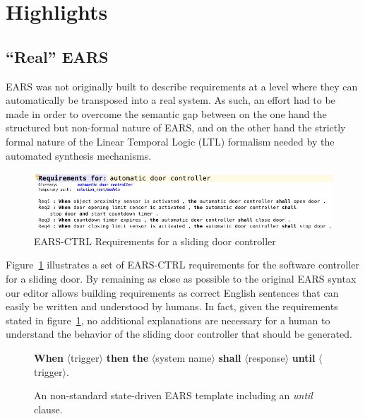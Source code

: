 \section{Highlights}

\subsection{``Real'' EARS}

EARS was not originally built to describe requirements at a level where they can
automatically be transposed into a real system. As such, an effort had to be
made in order to overcome the semantic gap between on the one hand the
structured but non-formal nature of EARS, and on the other hand the strictly
formal nature of the Linear Temporal Logic (LTL) formalism needed by the
automated synthesis mechanisms.


\begin{figure}[h!]
   \begin{center}
     \includegraphics[width=1\textwidth]{images/EARS-Reqs.png}
     \caption{\textsf{EARS-CTRL} Requirements for a sliding door
     controller}
     \label{fig:ears_reqs}
   \end{center}
 \end{figure}
 
Figure~\ref{fig:ears_reqs} illustrates a set of \textsf{EARS-CTRL} requirements 
for the software controller for a sliding door. By remaining as close as
possible to the original EARS syntax our editor allows building requirements as
correct English sentences that can easily be written and understood by humans.
In fact, given the requirements stated in figure~\ref{fig:ears_reqs}, no
additional explanations are necessary for a human to understand the behavior of
the sliding door controller that should be generated.

\begin{figure}[h!]
\begin{center}
\textbf{When} $\langle$trigger$\rangle$ \textbf{then the}
$\langle$system name$\rangle$ \textbf{shall}
$\langle$response$\rangle$ \textbf{until}
$\langle$trigger$\rangle$.
\caption{An non-standard state-driven EARS template including an \emph{until}
clause.}
\label{fig:ears_template_while}
\end{center}
\end{figure}

